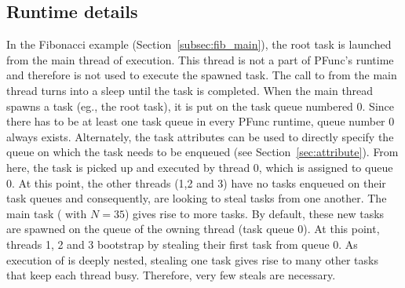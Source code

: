\subsection{Runtime details}

In the Fibonacci example (Section~\ref{subsec:fib_main}), the root task is
launched from the main thread of execution. This thread is not a part of
PFunc's runtime and therefore is not used to execute the spawned task. The call
to  from the main thread turns into a sleep until the
task is completed. When the main thread spawns a task (eg., the root task), it
is put on the task queue numbered 0. Since there has to be at least one task
queue in every PFunc runtime, queue number 0 always exists. Alternately, the
task attributes can be used to directly specify the queue on which the task
needs to be enqueued (see Section~\ref{sec:attribute}). From here, the task is
picked up and executed by thread 0, which is assigned to queue 0.  At this
point, the other threads (1,2 and 3) have no tasks enqueued on their task
queues and consequently, are looking to steal tasks from one another.  The main
task ( with $N=35$) gives rise to more tasks. By default, 
these new tasks are spawned on the queue of the owning thread (task queue 0).
At this point, threads 1, 2 and 3 bootstrap by stealing their first task from
queue 0. As execution of  is deeply nested, stealing one 
task gives rise to many other tasks that keep each thread busy. Therefore, very
few steals are necessary.


